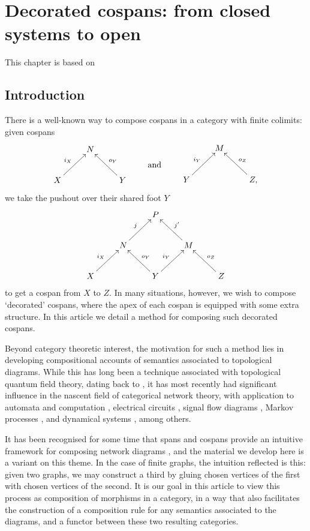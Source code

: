 \chapter[Decorated cospans]{Decorated cospans: from closed systems to open}

This chapter is based on \cite{fong_decorated_2015}


\section{Introduction}

There is a well-known way to compose cospans in a category with finite colimits:
given cospans
\[
  \begin{aligned}
    \xymatrix{
      & N \\
      X \ar[ur]^{i_X} && Y \ar[ul]_{o_Y}
    }
  \end{aligned}
  \qquad \vcenter{\xymatrix{\mbox{and}}} \qquad
  \begin{aligned}
    \xymatrix{
      & M \\
      Y \ar[ur]^{i_Y} && Z, \ar[ul]_{o_Z}
    }
  \end{aligned}
\]
we take the pushout over their shared foot $Y$ 
\[
  \xymatrix{
    && P \\
    & N \ar[ur]^j && M \ar[ul]_{j'} \\
    X \ar[ur]^{i_X} && Y \ar[ul]_{o_Y} \ar[ur]^{i_Y} && Z \ar[ul]_{o_Z}
  }
\]
to get a cospan from $X$ to $Z$. In many situations, however, we wish to compose
`decorated' cospans, where the apex of each cospan is equipped with some extra
structure. In this article we detail a method for composing such decorated
cospans. 

Beyond category theoretic interest, the motivation for such a method lies in
developing compositional accounts of semantics associated to topological
diagrams. While this has long been a technique associated with topological
quantum field theory, dating back to \cite{At}, it has most recently had
significant influence in the nascent field of categorical network theory, with
application to automata and computation \cite{KSW2, Sp}, electrical circuits
\cite{BF}, signal flow diagrams \cite{BSZ, BE}, Markov processes \cite{BP,
ASW}, and dynamical systems \cite{VSL}, among others. 

It has been recognised for some time that spans and cospans provide an intuitive
framework for composing network diagrams \cite{KSW}, and the material we develop
here is a variant on this theme. In the case of finite graphs, the intuition
reflected is this: given two graphs, we may construct a third by gluing chosen
vertices of the first with chosen vertices of the second. It is our goal in this
article to view this process as composition of morphisms in a category, in a way
that also facilitates the construction of a composition rule for any semantics
associated to the diagrams, and a functor between these two resulting
categories.

